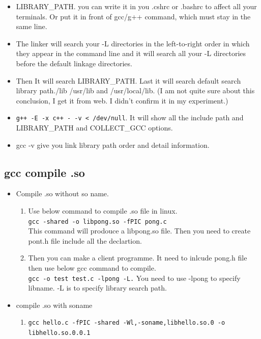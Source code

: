 \documentclass[a4paper,12pt,twoside]{book}
\begin{document}
\begin{itemize}
\begin{itemize}
   \item LIBRARY\_PATH. you can write it in you .cshrc or .bashrc to affect all your terminals. Or put it in front of gcc/g++ command, which must stay in the same line.        
	 
	\item The linker will search your -L directories in the left-to-right order in which they appear in the command line and it will search all your -L directories before the default linkage directories.
	
	\item Then It will search LIBRARY\_PATH. Last it will search default search library path./lib /usr/lib and /usr/local/lib. (I am not quite sure about this conclusion, I get it from web. I didn't confirm it in my experiment.)
	
	\item \verb=g++ -E -x c++ - -v < /dev/null=. It will show all the include path and LIBRARY\_PATH and COLLECT\_GCC options.

	\item gcc -v give you link library path order and detail information. 
	\end{itemize}

\subsection{gcc compile .so}
  \begin{itemize}
  \item Compile .so without so name.
	\begin{enumerate}
	\item Use below command to compile .so file in linux. \\
   \verb=gcc -shared -o libpong.so -fPIC pong.c= \\
   This command will prodouce a libpong.so file. Then you need to create pont.h file include all the declartion. 
   
   \item Then you can make a client programme. It need to inlcude pong.h file then use below gcc command to compile. \\
	\verb=gcc -o test test.c -lpong -L.=
	You need to use -lpong to specify libname. -L is to specify library search path.        
	\end{enumerate}

       \item compile .so with soname 
       \begin{enumerate}
		\item \verb=gcc hello.c -fPIC -shared -Wl,-soname,libhello.so.0 -o libhello.so.0.0.1= 
		

\end{enumerate}
\end{itemize}
\end{itemize}
\end{document}
